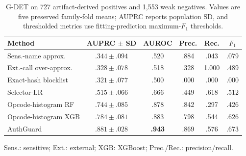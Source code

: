 \begin{table}[t]
  \centering
  \caption{G-DET on 727 artifact-derived positives and 1,553 weak negatives. Values are five preserved family-fold means; AUPRC reports population SD, and thresholded metrics use fitting-prediction maximum-$F_1$ thresholds.}
  \label{tab:gdet-performance}
  \scriptsize
  \setlength{\tabcolsep}{2.0pt}
  \begin{tabular}{@{}lccccc@{}}
    \toprule
    Method & \shortstack{AUPRC\\$\pm$ SD} & AUROC & Prec. & Rec. & $F_1$ \\
    \midrule
    Sens.-name approx. & $.344\pm.094$ & .520 & .884 & .043 & .079 \\
    Ext.-call over-approx. & $.328\pm.078$ & .518 & .328 & 1.000 & .489 \\
    Exact-hash blocklist & $.321\pm.077$ & .500 & .000 & .000 & .000 \\
    Selector-LR & $.515\pm.066$ & .666 & .449 & .618 & .512 \\
    Opcode-histogram RF & $.744\pm.085$ & .878 & .842 & .297 & .426 \\
    Opcode-histogram XGB & $.784\pm.081$ & .883 & .798 & .544 & .626 \\
    AuthGuard & $\mathbf{.881\pm.028}$ & \textbf{.943} & .869 & .576 & .673 \\
    \bottomrule
  \end{tabular}
  \vspace{1pt}

  \parbox{\columnwidth}{\scriptsize Sens.: sensitive; Ext.: external; XGB: XGBoost; Prec./Rec.: precision/recall.}
\end{table}
